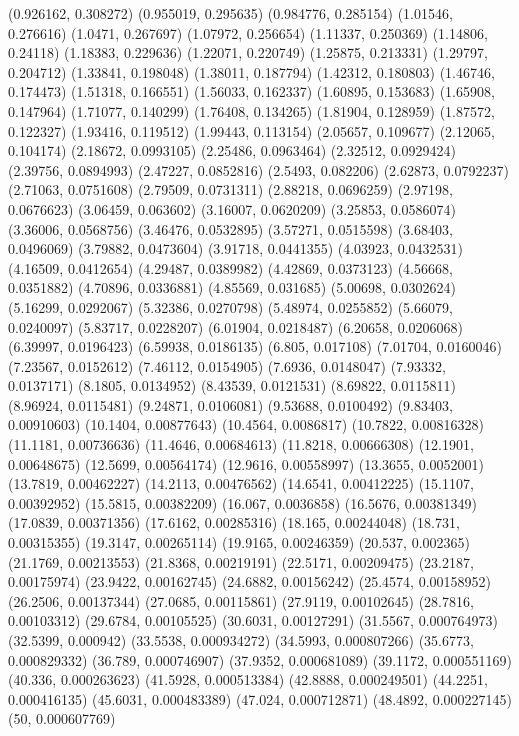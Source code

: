 {(0.926162, 0.308272)
(0.955019, 0.295635)
(0.984776, 0.285154)
(1.01546, 0.276616)
(1.0471, 0.267697)
(1.07972, 0.256654)
(1.11337, 0.250369)
(1.14806, 0.24118)
(1.18383, 0.229636)
(1.22071, 0.220749)
(1.25875, 0.213331)
(1.29797, 0.204712)
(1.33841, 0.198048)
(1.38011, 0.187794)
(1.42312, 0.180803)
(1.46746, 0.174473)
(1.51318, 0.166551)
(1.56033, 0.162337)
(1.60895, 0.153683)
(1.65908, 0.147964)
(1.71077, 0.140299)
(1.76408, 0.134265)
(1.81904, 0.128959)
(1.87572, 0.122327)
(1.93416, 0.119512)
(1.99443, 0.113154)
(2.05657, 0.109677)
(2.12065, 0.104174)
(2.18672, 0.0993105)
(2.25486, 0.0963464)
(2.32512, 0.0929424)
(2.39756, 0.0894993)
(2.47227, 0.0852816)
(2.5493, 0.082206)
(2.62873, 0.0792237)
(2.71063, 0.0751608)
(2.79509, 0.0731311)
(2.88218, 0.0696259)
(2.97198, 0.0676623)
(3.06459, 0.063602)
(3.16007, 0.0620209)
(3.25853, 0.0586074)
(3.36006, 0.0568756)
(3.46476, 0.0532895)
(3.57271, 0.0515598)
(3.68403, 0.0496069)
(3.79882, 0.0473604)
(3.91718, 0.0441355)
(4.03923, 0.0432531)
(4.16509, 0.0412654)
(4.29487, 0.0389982)
(4.42869, 0.0373123)
(4.56668, 0.0351882)
(4.70896, 0.0336881)
(4.85569, 0.031685)
(5.00698, 0.0302624)
(5.16299, 0.0292067)
(5.32386, 0.0270798)
(5.48974, 0.0255852)
(5.66079, 0.0240097)
(5.83717, 0.0228207)
(6.01904, 0.0218487)
(6.20658, 0.0206068)
(6.39997, 0.0196423)
(6.59938, 0.0186135)
(6.805, 0.017108)
(7.01704, 0.0160046)
(7.23567, 0.0152612)
(7.46112, 0.0154905)
(7.6936, 0.0148047)
(7.93332, 0.0137171)
(8.1805, 0.0134952)
(8.43539, 0.0121531)
(8.69822, 0.0115811)
(8.96924, 0.0115481)
(9.24871, 0.0106081)
(9.53688, 0.0100492)
(9.83403, 0.00910603)
(10.1404, 0.00877643)
(10.4564, 0.0086817)
(10.7822, 0.00816328)
(11.1181, 0.00736636)
(11.4646, 0.00684613)
(11.8218, 0.00666308)
(12.1901, 0.00648675)
(12.5699, 0.00564174)
(12.9616, 0.00558997)
(13.3655, 0.0052001)
(13.7819, 0.00462227)
(14.2113, 0.00476562)
(14.6541, 0.00412225)
(15.1107, 0.00392952)
(15.5815, 0.00382209)
(16.067, 0.0036858)
(16.5676, 0.00381349)
(17.0839, 0.00371356)
(17.6162, 0.00285316)
(18.165, 0.00244048)
(18.731, 0.00315355)
(19.3147, 0.00265114)
(19.9165, 0.00246359)
(20.537, 0.002365)
(21.1769, 0.00213553)
(21.8368, 0.00219191)
(22.5171, 0.00209475)
(23.2187, 0.00175974)
(23.9422, 0.00162745)
(24.6882, 0.00156242)
(25.4574, 0.00158952)
(26.2506, 0.00137344)
(27.0685, 0.00115861)
(27.9119, 0.00102645)
(28.7816, 0.00103312)
(29.6784, 0.00105525)
(30.6031, 0.00127291)
(31.5567, 0.000764973)
(32.5399, 0.000942)
(33.5538, 0.000934272)
(34.5993, 0.000807266)
(35.6773, 0.000829332)
(36.789, 0.000746907)
(37.9352, 0.000681089)
(39.1172, 0.000551169)
(40.336, 0.000263623)
(41.5928, 0.000513384)
(42.8888, 0.000249501)
(44.2251, 0.000416135)
(45.6031, 0.000483389)
(47.024, 0.000712871)
(48.4892, 0.000227145)
(50, 0.000607769)
}


